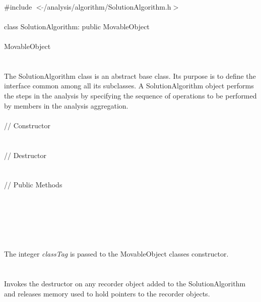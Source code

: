 
   \\
\indent \#include $<\tilde{ }$/analysis/algorithm/SolutionAlgorithm.h$>$  \\

  \\
\indent class SolutionAlgorithm: public MovableObject  \\

 \\
\indent MovableObject \\
\indent{} \\

 \\ 
\indent The SolutionAlgorithm class is an abstract base class. Its purpose
is to define the interface common among all its subclasses. A
SolutionAlgorithm object performs the steps in the analysis by specifying
the sequence of operations to be performed by members in the analysis
aggregation.\\


 \\ 
\indent // Constructor \\ 
\\  \\
\indent // Destructor \\
\\  \\
\indent // Public Methods  \\
 \\
\\	
 \\
 \\


 \\ 
\\ 
The integer {\em classTag} is passed to the MovableObject classes
constructor. \\

 \\
\\ 
Invokes the destructor on any recorder object added to the
SolutionAlgorithm and releases memory used to hold pointers to the
recorder objects. \\


